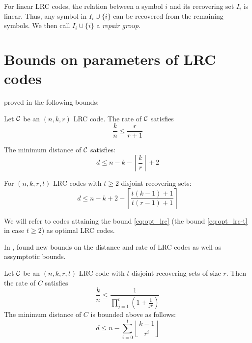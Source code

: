 For linear LRC codes, the relation between a symbol $i$ and its recovering set $I_i$ is linear. Thus, any symbol in $I_i \cup \{i\}$ can be recovered from the remaining symbols. We then call $I_i \cup \{i\}$ a \textit{repair group}.

\section{Bounds on parameters of LRC codes}
\citeauthor*{GHSY12} proved in \cite{GHSY12} the following bounds:
\begin{thm}
Let ${\mathcal C}$ be an $(n,k,r)$ LRC code. The rate of ${\mathcal C}$ satisfies
\begin{equation}
    \frac{k}{n} \leq \frac{r}{r+1}
\end{equation}

\noindent The minimum distance of ${\mathcal C}$ satisfies:
\begin{equation}\label{eq:opt_lrc}
d \leq n -k - \left\lceil \frac{k}{r} \right\rceil + 2
\end{equation}


\end{thm}


\begin{thm}

For $(n,k,r,t)$ LRC codes with $t \geq 2$ disjoint recovering sets:
\begin{equation}\label{eq:opt_lrc-t}
    d \leq n-k + 2 - \left\lceil \frac{t(k-1)+1}{t(r-1)+1} \right\rceil
\end{equation}
\end{thm}

We will refer to codes attaining the bound \ref{eq:opt_lrc} (the bound \ref{eq:opt_lrc-t} in case $t \geq 2$) as optimal LRC codes.

In \cite{bounds_on_LRC}, \citeauthor{bounds_on_LRC} found new bounds on the distance and rate of LRC codes as well as assymptotic bounds.

\begin{thm}\label{thm:lrc_rate}
Let ${\mathcal C}$ be an $(n,k,r,t)$ LRC code with $t$ disjoint recovering sets of size $r$. Then the rate of $C$ satisfies
\begin{equation}\label{eq:rate_lrc}
\frac{k}{n} \leq \frac{1}{\prod_{j=1}^t(1+\frac{1}{jr})}
\end{equation}
The minimum distance of $C$ is bounded above as follows:
\begin{equation}\label{eq:ass_rate_lrc}
d \leq n - \sum_{i=0}^t \left\lfloor \frac{k-1}{r^i} \right\rfloor
\end{equation}
\end{thm}

